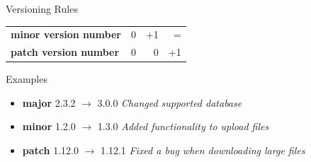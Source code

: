 \begin{frame}{\insertsubsection}
\begin{fancycolumns}[b]
\begin{note}{Versioning Rules }
\begin{table}
\begin{tabular}{lrrr}
					\textbf{minor version number} & 0 & +1 & = \\
					\textbf{patch version number} & 0 & 0 & +1 \\
					\bottomrule
				\end{tabular}
			\end{table}
		\end{note}
		\begin{example}{Examples}
			\begin{itemize}
				\item \textbf{major} 2.3.2 $\rightarrow$ 3.0.0
				\textit{Changed supported database}
				\item \textbf{minor} 1.2.0 $\rightarrow$ 1.3.0
				\textit{Added functionality to upload files}
				\item \textbf{patch} 1.12.0 $\rightarrow$ 1.12.1
				\textit{Fixed a bug when downloading large files}
			\end{itemize}
		\end{example}
	\end{fancycolumns}
\end{frame}